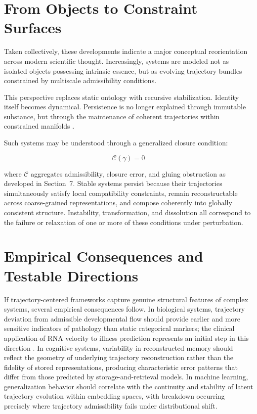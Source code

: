 \documentclass[12pt,a4paper]{article}
\begin{document}
\section{From Objects to Constraint Surfaces}

Taken collectively, these developments indicate a major conceptual reorientation
across modern scientific thought. Increasingly, systems are modeled not as isolated
objects possessing intrinsic essence, but as evolving trajectory bundles constrained
by multiscale admissibility conditions.

This perspective replaces static ontology with recursive stabilization. Identity
itself becomes dynamical. Persistence is no longer explained through immutable
substance, but through the maintenance of coherent trajectories within constrained
manifolds \cite{Friston,Rosen,Thompson}.

Such systems may be understood through a generalized closure condition:

\[
\mathcal{C}(\gamma) = 0
\]

where $\mathcal{C}$ aggregates admissibility, closure error, and gluing obstruction
as developed in Section~7. Stable systems persist because their trajectories
simultaneously satisfy local compatibility constraints, remain reconstructable across
coarse-grained representations, and compose coherently into globally consistent
structure. Instability, transformation, and dissolution all correspond to the failure
or relaxation of one or more of these conditions under perturbation.

\section{Empirical Consequences and Testable Directions}

If trajectory-centered frameworks capture genuine structural features of complex
systems, several empirical consequences follow. In biological systems, trajectory
deviation from admissible developmental flow should provide earlier and more sensitive
indicators of pathology than static categorical markers; the clinical application of
RNA velocity to illness prediction represents an initial step in this direction
\cite{RNAVelocity}. In cognitive systems, variability in reconstructed memory should
reflect the geometry of underlying trajectory reconstruction rather than the fidelity
of stored representations, producing characteristic error patterns that differ from
those predicted by storage-and-retrieval models. In machine learning, generalization
behavior should correlate with the continuity and stability of latent trajectory
evolution within embedding spaces, with breakdown occurring precisely where trajectory
admissibility fails under distributional shift.
\end{document}
